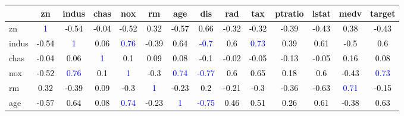 \documentclass[]{article}
\begin{document}
\begin{table}[H]
\centering
\begin{tabular}{l|c|c|c|c|c|c|c|c|c|c|c|c|c}
\hline
  & zn & indus & chas & nox & rm & age & dis & rad & tax & ptratio & lstat & medv & target\\
\hline
zn & \textcolor{blue}{1} & \textcolor{black}{-0.54} & \textcolor{black}{-0.04} & \textcolor{black}{-0.52} & \textcolor{black}{0.32} & \textcolor{black}{-0.57} & \textcolor{black}{0.66} & \textcolor{black}{-0.32} & \textcolor{black}{-0.32} & \textcolor{black}{-0.39} & \textcolor{black}{-0.43} & \textcolor{black}{0.38} & \textcolor{black}{-0.43}\\
\hline
indus & \textcolor{black}{-0.54} & \textcolor{blue}{1} & \textcolor{black}{0.06} & \textcolor{blue}{0.76} & \textcolor{black}{-0.39} & \textcolor{black}{0.64} & \textcolor{blue}{-0.7} & \textcolor{black}{0.6} & \textcolor{blue}{0.73} & \textcolor{black}{0.39} & \textcolor{black}{0.61} & \textcolor{black}{-0.5} & \textcolor{black}{0.6}\\
\hline
chas & \textcolor{black}{-0.04} & \textcolor{black}{0.06} & \textcolor{blue}{1} & \textcolor{black}{0.1} & \textcolor{black}{0.09} & \textcolor{black}{0.08} & \textcolor{black}{-0.1} & \textcolor{black}{-0.02} & \textcolor{black}{-0.05} & \textcolor{black}{-0.13} & \textcolor{black}{-0.05} & \textcolor{black}{0.16} & \textcolor{black}{0.08}\\
\hline
nox & \textcolor{black}{-0.52} & \textcolor{blue}{0.76} & \textcolor{black}{0.1} & \textcolor{blue}{1} & \textcolor{black}{-0.3} & \textcolor{blue}{0.74} & \textcolor{blue}{-0.77} & \textcolor{black}{0.6} & \textcolor{black}{0.65} & \textcolor{black}{0.18} & \textcolor{black}{0.6} & \textcolor{black}{-0.43} & \textcolor{blue}{0.73}\\
\hline
rm & \textcolor{black}{0.32} & \textcolor{black}{-0.39} & \textcolor{black}{0.09} & \textcolor{black}{-0.3} & \textcolor{blue}{1} & \textcolor{black}{-0.23} & \textcolor{black}{0.2} & \textcolor{black}{-0.21} & \textcolor{black}{-0.3} & \textcolor{black}{-0.36} & \textcolor{black}{-0.63} & \textcolor{blue}{0.71} & \textcolor{black}{-0.15}\\
\hline
age & \textcolor{black}{-0.57} & \textcolor{black}{0.64} & \textcolor{black}{0.08} & \textcolor{blue}{0.74} & \textcolor{black}{-0.23} & \textcolor{blue}{1} & \textcolor{blue}{-0.75} & \textcolor{black}{0.46} & \textcolor{black}{0.51} & \textcolor{black}{0.26} & \textcolor{black}{0.61} & \textcolor{black}{-0.38} & \textcolor{black}{0.63}\\

\end{tabular}
\end{table}
\end{document}
